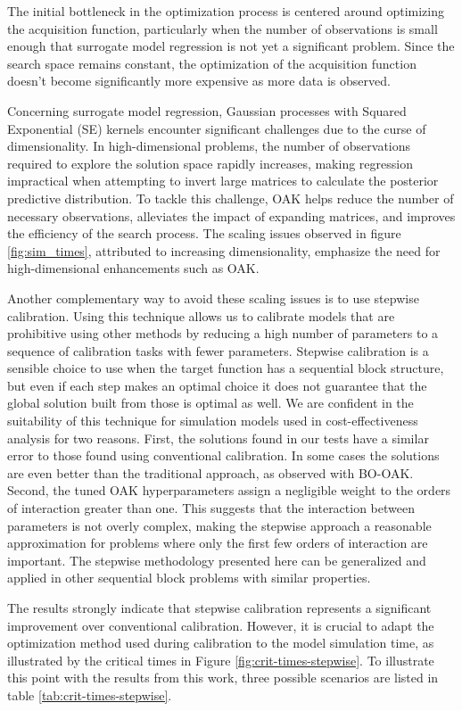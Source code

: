 \documentclass[sn-mathphys,Numbered]{sn-jnl}%
\begin{document}
The initial bottleneck in the optimization process is centered around optimizing the acquisition function, particularly when the number of observations is small enough that surrogate model regression is not yet a significant problem. Since the search space remains constant, the optimization of the acquisition function doesn't become significantly more expensive as more data is observed.

Concerning surrogate model regression, Gaussian processes with Squared Exponential (SE) kernels encounter significant challenges due to the curse of dimensionality. In high-dimensional problems, the number of observations required to explore the solution space rapidly increases, making regression impractical when attempting to invert large matrices to calculate the posterior predictive distribution. To tackle this challenge, OAK helps reduce the number of necessary observations, alleviates the impact of expanding matrices, and improves the efficiency of the search process. The scaling issues observed in figure \ref{fig:sim_times}, attributed to increasing dimensionality, emphasize the need for high-dimensional enhancements such as OAK.

Another complementary way to avoid these scaling issues is to use stepwise calibration. Using this technique allows us to calibrate models that are prohibitive using other methods by reducing a high number of parameters to a sequence of calibration tasks with fewer parameters. Stepwise calibration is a sensible choice to use when the target function has a sequential block structure, but even if each step makes an optimal choice it does not guarantee that the global solution built from those is optimal as well. We are confident in the suitability of this technique for simulation models used in cost-effectiveness analysis for two reasons. First, the solutions found in our tests have a similar error to those found using conventional calibration. In some cases the solutions are even better than the traditional approach, as observed with BO-OAK. Second, the tuned OAK hyperparameters assign a negligible weight to the orders of interaction greater than one. This suggests that the interaction between parameters is not overly complex, making the stepwise approach a reasonable approximation for problems where only the first few orders of interaction are important\cite{gp-additive}. The stepwise methodology presented here can be generalized and applied in other sequential block problems with similar properties.

The results strongly indicate that stepwise calibration represents a significant improvement over conventional calibration. However, it is crucial to adapt the optimization method used during calibration to the model simulation time, as illustrated by the critical times in Figure \ref{fig:crit-times-stepwise}. To illustrate this point with the results from this work, three possible scenarios are listed in table \ref{tab:crit-times-stepwise}.
\end{document}
